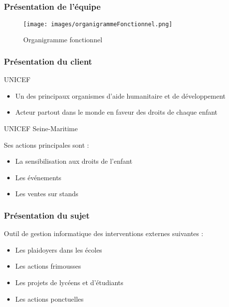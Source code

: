 \subsection{} %

\begin{frame}
\frametitle{Présentation de l'équipe}
	\begin{figure}
		\texttt{[image: images/organigrammeFonctionnel.png]}
		\caption{Organigramme fonctionnel}
		\label{OF}
	\end{figure}
\end{frame}

\begin{frame}
\frametitle{Présentation du client}
	\begin{center}
		UNICEF
	\end{center}
	\begin{itemize}
		\item Un des principaux organismes d’aide humanitaire et de développement
		\item Acteur partout dans le monde en faveur des droits de chaque enfant
	\end{itemize}
	
	\begin{center}
		UNICEF Seine-Maritime
	\end{center}
	Ses actions principales sont : 
	\begin{itemize}
		\item La sensibilisation aux droits de l'enfant
		\item Les événements 
		\item Les ventes sur stands
	\end{itemize}
	
\end{frame}
\begin{frame}
\frametitle{Présentation du sujet}
Outil de gestion informatique des interventions externes suivantes :

	\begin{itemize}
		\item Les plaidoyers dans les \'ecoles
		\item Les actions frimousses
		\item Les projets de lycéens et d'étudiants
		\item Les actions ponctuelles
	\end{itemize}
	
\end{frame}